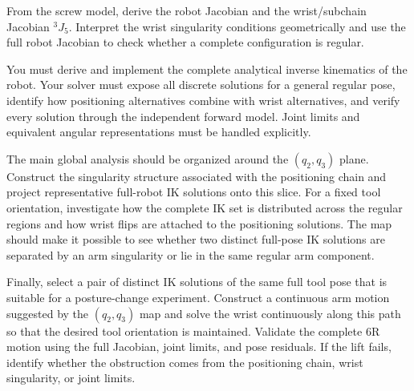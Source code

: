 \documentclass[11pt,a4paper]{article}
\begin{document}
From the screw model, derive the robot Jacobian and the wrist/subchain Jacobian $^{3}J_{5}$. Interpret the wrist singularity conditions geometrically and use the full robot Jacobian to check whether a complete configuration is regular.

You must derive and implement the complete analytical inverse kinematics of the robot. Your solver must expose all discrete solutions for a general regular pose, identify how positioning alternatives combine with wrist alternatives, and verify every solution through the independent forward model. Joint limits and equivalent angular representations must be handled explicitly.

The main global analysis should be organized around the $(q_2,q_3)$ plane. Construct the singularity structure associated with the positioning chain and project representative full-robot IK solutions onto this slice. For a fixed tool orientation, investigate how the complete IK set is distributed across the regular regions and how wrist flips are attached to the positioning solutions. The map should make it possible to see whether two distinct full-pose IK solutions are separated by an arm singularity or lie in the same regular arm component.

Finally, select a pair of distinct IK solutions of the same full tool pose that is suitable for a posture-change experiment. Construct a continuous arm motion suggested by the $(q_2,q_3)$ map and solve the wrist continuously along this path so that the desired tool orientation is maintained. Validate the complete 6R motion using the full Jacobian, joint limits, and pose residuals. If the lift fails, identify whether the obstruction comes from the positioning chain, wrist singularity, or joint limits.
\end{document}
